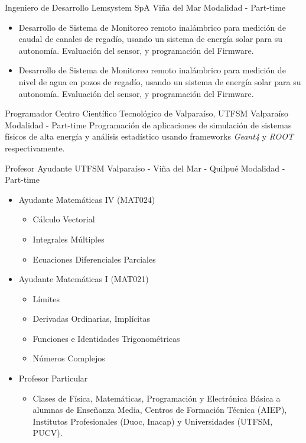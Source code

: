 \documentclass[10pt,letterpaper,sans]{moderncv}
\begin{document}
{Ingeniero de Desarrollo}
{Lemsystem SpA}
{Viña del Mar}
{Modalidad - Part-time}
{
\begin{itemize}
\item Desarrollo de Sistema de Monitoreo remoto inalámbrico para medición de caudal de
canales de regadío, usando un sistema de energía solar para su autonomía. Evaluación
del sensor, y programación del Firmware.
\item Desarrollo de Sistema de Monitoreo remoto inalámbrico para medición de nivel de agua en pozos de 
regadío, usando un sistema de energía solar para su autonomía. Evaluación
del sensor, y programación del Firmware.
\end{itemize}
}
{Programador}
{Centro Científico Tecnológico de Valparaíso, UTFSM}
{Valparaíso}
{Modalidad - Part-time}
{Programación de aplicaciones de simulación de sistemas físicos de alta energía y análisis estadístico 
usando frameworks \emph{Geant4} y \emph{ROOT} respectivamente.}

{Profesor Ayudante}
{UTFSM}
{Valparaíso - Viña del Mar - Quilpué}
{Modalidad - Part-time}
{
\begin{itemize}
\item Ayudante Matemáticas IV (MAT024)
\begin{itemize}
\item Cálculo Vectorial
\item Integrales Múltiples
\item Ecuaciones Diferenciales Parciales
\end{itemize}
\item Ayudante Matemáticas I (MAT021)
\begin{itemize}
\item Límites
\item Derivadas Ordinarias, Implícitas
\item Funciones e Identidades Trigonométricas
\item Números Complejos
\end{itemize}
\item Profesor Particular
\begin{itemize}
\item Clases de Física, Matemáticas, Programación y Electrónica Básica
a alumnas de Enseñanza Media, Centros de Formación Técnica (AIEP),
Institutos Profesionales (Duoc, Inacap) y Universidades (UTFSM, PUCV).
\end{itemize}
\end{itemize}}
\end{document}
